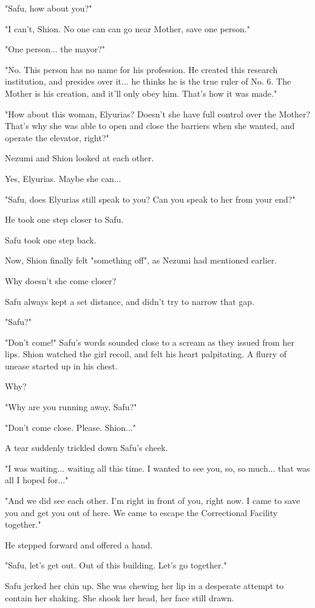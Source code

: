 "Safu, how about you?"

"I can't, Shion. No one can can go near Mother, save one person."

"One person... the mayor?"

"No. This person has no name for his profession. He created this
research institution, and presides over it... he thinks he is the true
ruler of No. 6. The Mother is his creation, and it'll only obey him.
That's how it was made."

"How about this woman, Elyurias? Doesn't she have full control over the
Mother? That's why she was able to open and close the barriers when she
wanted, and operate the elevator, right?"

Nezumi and Shion looked at each other.

Yes, Elyurias. Maybe she can...

"Safu, does Elyurias still speak to you? Can you speak to her from your
end?"

He took one step closer to Safu.

Safu took one step back.

Now, Shion finally felt "something off", as Nezumi had mentioned
earlier.

Why doesn't she come closer?

Safu always kept a set distance, and didn't try to narrow that gap.

"Safu?"

"Don't come!" Safu's words sounded close to a scream as they issued from
her lips. Shion watched the girl recoil, and felt his heart palpitating.
A flurry of unease started up in his chest.

Why?

"Why are you running away, Safu?"

"Don't come close. Please. Shion..."

A tear suddenly trickled down Safu's cheek.

"I was waiting... waiting all this time. I wanted to see you, so, so
much... that was all I hoped for..."

"And we did see each other. I'm right in front of you, right now. I came
to save you and get you out of here. We came to escape the Correctional
Facility together."

He stepped forward and offered a hand.

"Safu, let's get out. Out of this building. Let's go together."

Safu jerked her chin up. She was chewing her lip in a desperate attempt
to contain her shaking. She shook her head, her face still drawn.

